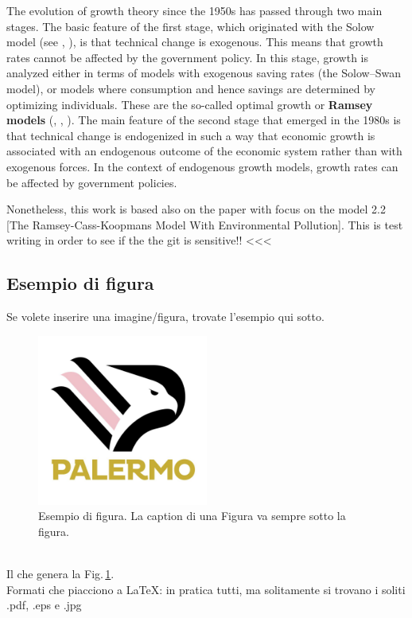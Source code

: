 The evolution of growth theory since the 1950s has passed through two main stages. The basic feature of the first stage, which originated with the Solow model (see \cite[Solow]{solow_contribution_1956}, \cite[Swan]{swan_economic_1956}), is that technical change is exogenous. This means that growth rates cannot be affected by the government policy. In this stage, growth is analyzed either in terms of models with exogenous saving rates (the Solow–Swan model), or models where consumption and hence savings are determined by optimizing individuals. These are the so-called optimal growth or \textbf{Ramsey models} (\cite[Ramsey]{ramsey_mathematical_1928}, \cite[Cass]{cass_optimum_1965}, \cite[Koopmans]{koopmans_concept_1963}). The main feature of the second stage that emerged in the 1980s is that technical change is endogenized in such a way that economic growth is associated with an endogenous
outcome of the economic system rather than with exogenous forces. In the context of endogenous growth models, growth rates can be affected by government policies.


Nonetheless, this work is based also on the paper \cite{caravaggio_nonlinear_2018} with focus on the model 2.2 [The Ramsey-Cass-Koopmans Model With Environmental Pollution]. 
This is test writing in order to see if the the git is sensitive!! <<<

\subsection{Esempio di figura}\label{subsec:esempio_figura}
Se volete inserire una imagine/figura, trovate l'esempio qui sotto.
\begin{figure}[h]
    \centering
    \includegraphics[width=0.5\textwidth]{Figure/esempio.jpg}
    \caption{Esempio di figura. La caption di una Figura va sempre sotto la figura.}
    \label{fig:esempio_fig}
\end{figure}\\
Il che genera la Fig.\,\ref{fig:esempio_fig}.\\
Formati che piacciono a LaTeX: in pratica tutti, ma solitamente si trovano i soliti .pdf, .eps e .jpg
\cite[Chap 12]{Liptser-S-77}


